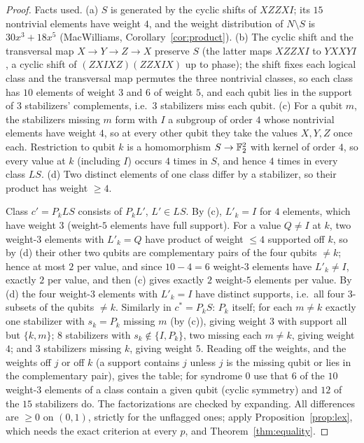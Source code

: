 \begin{proof}
Facts used. (a) $S$ is generated by the cyclic shifts of $XZZXI$; its $15$ nontrivial elements have weight $4$, and the weight distribution of $N\setminus S$ is $30x^3+18x^5$ (MacWilliams, Corollary~\ref{cor:product}). (b) The cyclic shift and the transversal map $X\to Y\to Z\to X$ preserve $S$ (the latter maps $XZZXI$ to $YXXYI$, a cyclic shift of $(ZXIXZ)(ZZXIX)$ up to phase); the shift fixes each logical class and the transversal map permutes the three nontrivial classes, so each class has $10$ elements of weight $3$ and $6$ of weight $5$, and each qubit lies in the support of $3$ stabilizers' complements, i.e.\ $3$ stabilizers miss each qubit. (c) For a qubit $m$, the stabilizers missing $m$ form with $I$ a subgroup of order $4$ whose nontrivial elements have weight $4$, so at every other qubit they take the values $X,Y,Z$ once each. Restriction to qubit $k$ is a homomorphism $S\to\mathbb{F}_2^2$ with kernel of order $4$, so every value at $k$ (including $I$) occurs $4$ times in $S$, and hence $4$ times in every class $LS$. (d) Two distinct elements of one class differ by a stabilizer, so their product has weight $\ge4$.

Class $c'=P_kLS$ consists of $P_kL'$, $L'\in LS$. By (c), $L'_k=I$ for $4$ elements, which have weight $3$ (weight-$5$ elements have full support). For a value $Q\ne I$ at $k$, two weight-$3$ elements with $L'_k=Q$ have product of weight $\le4$ supported off $k$, so by (d) their other two qubits are complementary pairs of the four qubits $\ne k$; hence at most $2$ per value, and since $10-4=6$ weight-$3$ elements have $L'_k\ne I$, exactly $2$ per value, and then (c) gives exactly $2$ weight-$5$ elements per value. By (d) the four weight-$3$ elements with $L'_k=I$ have distinct supports, i.e.\ all four $3$-subsets of the qubits $\ne k$. Similarly in $c^\ast=P_kS$: $P_k$ itself; for each $m\ne k$ exactly one stabilizer with $s_k=P_k$ missing $m$ (by (c)), giving weight $3$ with support all but $\{k,m\}$; $8$ stabilizers with $s_k\notin\{I,P_k\}$, two missing each $m\ne k$, giving weight $4$; and $3$ stabilizers missing $k$, giving weight $5$.
Reading off the weights, and the weights off $j$ or off $k$ (a support contains $j$ unless $j$ is the missing qubit or lies in the complementary pair), gives the table; for syndrome $0$ use that $6$ of the $10$ weight-$3$ elements of a class contain a given qubit (cyclic symmetry) and $12$ of the $15$ stabilizers do. The factorizations are checked by expanding. All differences are $\ge0$ on $(0,1)$, strictly for the unflagged ones; apply Proposition~\ref{prop:lex}, which needs the exact criterion at every $p$, and Theorem~\ref{thm:equality}.
\end{proof}

